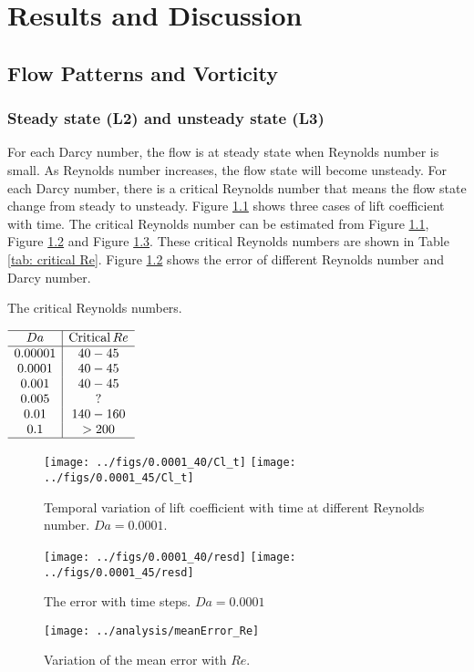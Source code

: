 \chapter{Results and Discussion}
\section{Flow Patterns and Vorticity}
\subsection{Steady state (L2) and unsteady state (L3)}
For each Darcy number, the flow is at steady state when Reynolds number is small. As Reynolds number increases, the flow state will become unsteady. For each Darcy number, there is a critical Reynolds number that means the flow state change from steady to unsteady. Figure \ref{fig: Cl_t} shows three cases of lift coefficient with time. The critical Reynolds number can be estimated from Figure \ref{fig: Cl_t}, Figure \ref{fig: resd} and Figure \ref{fig: error}.  These critical Reynolds numbers are shown in Table \ref{tab: critical Re}. Figure \ref{fig: resd} shows the error of different Reynolds number and Darcy number.

\begin{table}[]
	\centering
	\caption{The critical Reynolds numbers.}\label{tab: critical Re}
	$\begin{array}{c|c}
	\hline
	Da & \mathrm{Critical}\, Re \\ \hline
	0.00001& 40-45   \\
	0.0001 & 40-45 \\
	0.001  & 40-45 \\
	0.005  & ?   \\
	0.01   & 140-160 \\
	0.1    & >200\\
	\hline
	\end{array}$
\end{table}
\begin{figure}
	\centering
	{\texttt{[image: ../figs/0.0001\_40/Cl\_t]}}
	{\texttt{[image: ../figs/0.0001\_45/Cl\_t]}}
	\caption{Temporal variation of lift coefficient with time at different Reynolds number. $Da=0.0001$.}
	\label{fig: Cl_t}
\end{figure}
\begin{figure}
	\centering
	{\texttt{[image: ../figs/0.0001\_40/resd]}}
	{\texttt{[image: ../figs/0.0001\_45/resd]}}
	\caption{The error with time steps. $Da=0.0001$}
	\label{fig: resd}
\end{figure}
\begin{figure}
	\centering
	\texttt{[image: ../analysis/meanError\_Re]}
	\caption{Variation of the mean error with $Re$.}
	\label{fig: error}
\end{figure}

